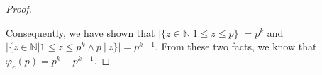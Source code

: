\documentclass{article}
\newcommand{\naturals}{\mathbb{N}}
\newcommand{\divides}{\:\mathbb{|}\: }
\begin{document}
\begin{enumerate}
\begin{enumerate}
\begin{proof}
\begin{enumerate}
            \end{enumerate}
            Consequently, we have shown that $|\{z \in \naturals| 1 \leq z \leq p\}|=p^k$ and $|\{z \in \naturals| 1 \leq z \leq p^k \land p \divides z\}|=p^{k-1}$. From these two facts, we know that $\varphi_e(p)=p^k-p^{k-1}$.
        \end{proof}

    \end{enumerate}
\end{enumerate}
\end{document}
